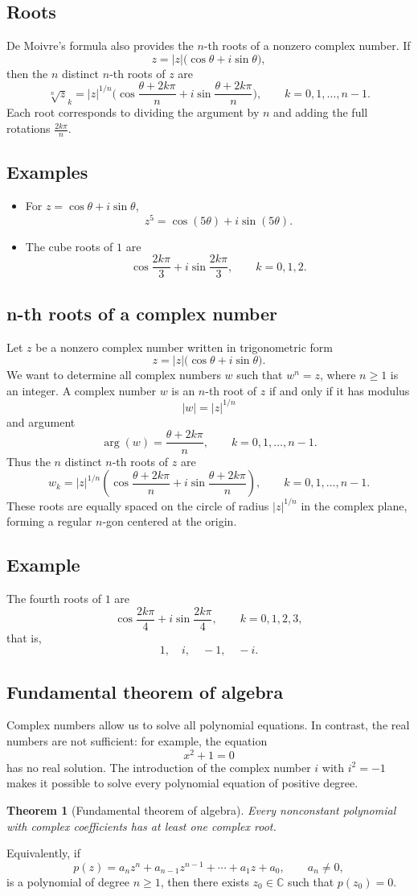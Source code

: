 \documentclass[11pt,a4paper]{article}
\theoremstyle{definition} \newtheorem{definition}{Definition} \theoremstyle{plain} \newtheorem{theorem}{Theorem}
\begin{document}
\subsection{Roots}
De Moivre's formula also provides the $n$-th roots of a nonzero complex number.
If
\[ z = |z|\bigl(\cos\theta + i\sin\theta\bigr), \]
then the $n$ distinct $n$-th roots of $z$ are
\[ \sqrt[n]{z}_k = |z|^{1/n}\bigl(\cos\frac{\theta + 2k\pi}{n}
+ i\sin\frac{\theta + 2k\pi}{n}\bigr), \qquad k=0,1,\ldots,n-1. \]
Each root corresponds to dividing the argument by $n$ and adding the full rotations $\frac{2k\pi}{n}$.
\subsection*{Examples}
\begin{itemize}
\item For $z = \cos\theta + i\sin\theta$,
\[
z^5 = \cos(5\theta) + i\sin(5\theta).
\]
\item The cube roots of $1$ are
\[
\cos\frac{2k\pi}{3} + i\sin\frac{2k\pi}{3},
\qquad k=0,1,2.
\]
\end{itemize}
\subsection{n-th roots of a complex number}
Let $z$ be a nonzero complex number written in trigonometric form
\[ z = |z|\bigl(\cos\theta + i\sin\theta\bigr). \]
We want to determine all complex numbers $w$ such that $w^n = z$, where $n\ge 1$ is an integer.
A complex number $w$ is an $n$-th root of $z$ if and only if it has modulus
\[ |w| = |z|^{1/n} \]
and argument
\[ \arg(w) = \frac{\theta + 2k\pi}{n}, \qquad k = 0,1,\ldots,n-1. \]
Thus the $n$ distinct $n$-th roots of $z$ are
\[ w_k = |z|^{1/n}
\left(
\cos\frac{\theta + 2k\pi}{n}
+ i\sin\frac{\theta + 2k\pi}{n}
\right), \qquad k=0,1,\ldots,n-1. \]
These roots are equally spaced on the circle of radius $|z|^{1/n}$ in the complex plane, forming a regular $n$-gon centered at the origin.
\subsection*{Example}
The fourth roots of $1$ are
\[ \cos\frac{2k\pi}{4} + i\sin\frac{2k\pi}{4}, \qquad k=0,1,2,3, \]
that is,
\[ 1,\quad i,\quad -1,\quad -i. \]
\subsection{Fundamental theorem of algebra}
Complex numbers allow us to solve all polynomial equations.
In contrast, the real numbers are not sufficient: for example, the equation
\[ x^2 + 1 = 0 \]
has no real solution.
The introduction of the complex number $i$ with $i^2 = -1$ makes it possible to solve every polynomial equation of positive degree.
\begin{theorem}[Fundamental theorem of algebra]\label{thm:fundamental-algebra} Every nonconstant polynomial with complex coefficients has at least one complex root. \end{theorem}
Equivalently, if
\[ p(z) = a_n z^n + a_{n-1} z^{n-1} + \cdots + a_1 z + a_0, \qquad a_n \neq 0, \]
is a polynomial of degree $n\ge 1$, then there exists $z_0 \in \mathbb{C}$ such that $p(z_0)=0$.
\end{document}
